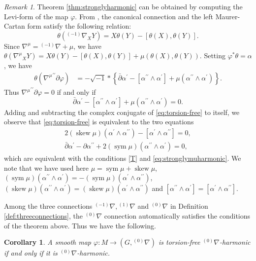 \documentclass[12pt]{amsart}
\newtheorem{Corollary}[Theorem]{Corollary}
\theoremstyle{definition}
\theoremstyle{remark}
\newtheorem{Remark}[Theorem]{Remark}
\numberwithin{equation}{section}
\begin{document}
\begin{Remark}\label{rm:torison-free}
 Theorem \ref{thm:stronglyharmonic} 
 can be obtained by computing the Levi-form of the 
 map $\varphi$. From \cite{BR}, 
 the canonical connection and the left 
 Maurer-Cartan form satisfy the following relation:
\begin{equation*}
 \theta ({{}^{(-1)}\nabla}_X Y) = X \theta(Y)- [ \theta (X), \theta (Y)].
\end{equation*}
 Since ${\nabla^{\mu}} = {{}^{(-1)}\nabla} + \mu$, we have
 $\theta ({\nabla^{\mu}}_X Y) = X \theta(Y)- [ \theta (X), \theta (Y)] + \mu (\theta (X), 
 \theta (Y))$.
 Setting $\varphi^* \theta = \alpha$, we have   
\begin{align*}
 \theta \left({\nabla^{ \mu}}^{\prime \prime}
 \partial \varphi \right) & = - \sqrt{-1} * \left\{
 \bar \partial \alpha^{\prime}
 - [\alpha^{\prime \prime} \wedge \alpha^{\prime}] 
 + \mu (\alpha^{\prime \prime} \wedge \alpha^{\prime})\right\}. 
\end{align*}
 Thus ${\nabla^{ \mu}}^{\prime \prime}
 \partial \varphi =0$ if and only if 
 \begin{equation}\label{eq:torsion-free}
 \bar \partial \alpha^{\prime}
 - [\alpha^{\prime \prime} \wedge \alpha^{\prime}] 
 + \mu (\alpha^{\prime \prime} \wedge \alpha^{\prime}) =0.
 \end{equation}
 Adding and subtracting the complex conjugate of \eqref{eq:torsion-free} to itself, 
 we observe that 
 \eqref{eq:torsion-free} is equivalent to the two equations
 \begin{align*}
  2 ({\operatorname {skew}} \mu) (\alpha^{\prime} \wedge \alpha^{\prime \prime}) - 
 [\alpha^{\prime} \wedge \alpha^{\prime \prime}] =0,\\ 
  \bar \partial \alpha^{\prime} -
  \partial \alpha^{\prime \prime} 
 + 2 ({\operatorname {sym}} \mu) (\alpha^{\prime \prime} \wedge \alpha^{\prime}) =0,
 \end{align*}
 which are equivalent with the conditions \eqref{T} and 
\eqref{eq:stronglymuharmonic}.
 We note that we have used here $\mu = {\operatorname {sym}} \mu+ {\operatorname {skew}} \mu$,  
 $({\operatorname {sym}} \mu) (\alpha^{\prime \prime} \wedge \alpha^{\prime})  = -
  ({\operatorname {sym}} \mu) (\alpha^{\prime} \wedge \alpha^{\prime \prime})$,
 $({\operatorname {skew}} \mu) (\alpha^{\prime \prime} \wedge \alpha^{\prime})  = 
  ({\operatorname {skew}} \mu) (\alpha^{\prime} \wedge \alpha^{\prime \prime})$ 
 and $[\alpha^{\prime \prime} \wedge \alpha^{\prime}] =
 [\alpha^{\prime} \wedge \alpha^{\prime \prime}]$.
\end{Remark}
 Among the three connections ${{}^{(-1)}\nabla}, {{}^{(1)}\nabla}$ and ${{}^{(0)}\nabla}$ in 
 Definition \ref{def:threeconnections}, 
 the ${{}^{(0)}\nabla}$ connection automatically 
 satisfies the conditions of the theorem above. Thus we have the following.
\begin{Corollary}
 A smooth map $\varphi:M\to(G, {{}^{(0)}\nabla})$ 
 is torsion-free ${{}^{(0)}\nabla}$-harmonic if and only if 
 it is ${{}^{(0)}\nabla}$-harmonic.
\end{Corollary}
\end{document}
